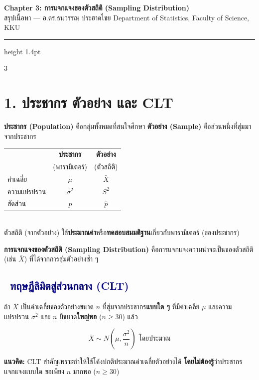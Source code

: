 \documentclass[9pt]{extarticle}
\newcommand{\dist}[1]{\subsection*{\textcolor{navy}{\textbullet\ #1}}}
\begin{document}
\begin{center}
{\Large\bfseries\color{navy} Chapter 3: การแจกแจงของตัวสถิติ (Sampling Distribution)}\\[2pt]
{\small สรุปเนื้อหา — อ.ดร.ธนวรรณ ประฮาดไชย \quad Department of Statistics, Faculty of Science, KKU}
\end{center}
\vspace{2pt}
{\color{gold}\hrule height 1.4pt}
\vspace{4pt}

\begin{multicols}{3}

\section*{1. ประชากร ตัวอย่าง และ CLT}
\textbf{ประชากร (Population)} คือกลุ่ม\allowbreak ทั้งหมดที่สนใจ\allowbreak ศึกษา \textbf{ตัวอย่าง (Sample)} คือส่วนหนึ่ง\allowbreak ที่สุ่มมาจาก\allowbreak ประชากร

\begin{formulabox}
\begin{tabular}{@{}l c c@{}}
 & \textbf{ประชากร} & \textbf{ตัวอย่าง}\\
 & (พารามิเตอร์) & (ตัวสถิติ)\\\hline
ค่าเฉลี่ย & $\mu$ & $\bar X$\\
ความแปรปรวน & $\sigma^2$ & $S^2$\\
สัดส่วน & $p$ & $\hat p$\\
\end{tabular}\\[2pt]
\footnotesize ตัวสถิติ (จากตัวอย่าง) ใช้\textbf{ประมาณค่า}หรือ\textbf{ทดสอบสมมติฐาน}เกี่ยวกับพารามิเตอร์ (ของประชากร)
\end{formulabox}

\textbf{การแจกแจงของตัวสถิติ (Sampling Distribution)} คือการแจกแจงความน่าจะเป็นของตัวสถิติ (เช่น $\bar X$) ที่ได้จากการสุ่มตัวอย่างซ้ำ ๆ

\dist{ทฤษฎีลิมิตสู่ส่วนกลาง (CLT)}
ถ้า $\bar X$ เป็นค่าเฉลี่ยของตัวอย่างขนาด $n$ ที่สุ่มจากประชากร\textbf{แบบใด ๆ} ที่มีค่าเฉลี่ย $\mu$ และความแปรปรวน $\sigma^2$ และ $n$ มีขนาด\textbf{ใหญ่พอ} ($n\ge30$) แล้ว
\begin{formulabox}
$$\bar X \sim N\left(\mu,\dfrac{\sigma^2}{n}\right) \text{ โดยประมาณ}$$
\end{formulabox}
\begin{ideabox}
\textbf{แนวคิด:} CLT สำคัญเพราะทำให้\allowbreak ใช้โค้งปกติ\allowbreak ประมาณค่าเฉลี่ยตัวอย่าง\allowbreak ได้ \textbf{โดยไม่ต้องรู้}\allowbreak ว่าประชากร\allowbreak แจกแจงแบบใด ขอเพียง $n$ มากพอ ($n\ge30$)
\end{ideabox}


\end{multicols}
\end{document}
